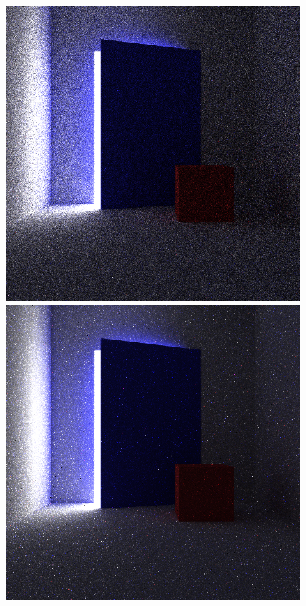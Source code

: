 \documentclass[ %
                    author={Callum Pearce},
                supervisor={Dr. Neill Campbell},
                    degree={MEng},
                     title={Learning the incident radiance for a continuous state space rather than a discrete one is more beneficial for Importance Sampling in Monte Carlo Path Tracing},
                  subtitle={},
                      type={research},
                      year={2019} ]{dissertation}
\begin{document}
\begin{figure}[h]
\centering
{}
  \includegraphics[width=\textwidth]{images/renders/door_room/default.png}   
\endminipage\hspace{1em}
  \includegraphics[width=\textwidth]{images/renders/door_room/sarsa.png}   

\end{figure}
\end{document}
